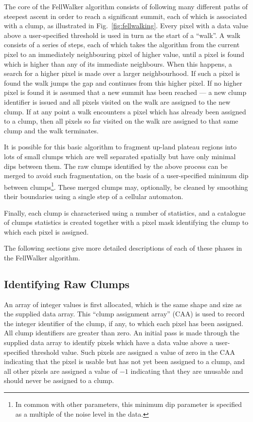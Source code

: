 \documentclass[final,authoryear,5p,times,twocolumn]{elsarticle}
\begin{document}
The core of the FellWalker algorithm consists of following many different
paths of steepest ascent in order to reach a significant summit, each of
which is associated with a clump, as illustrated in Fig.~\ref{fig:fellwalking}.
Every pixel with a data value above a user-specified threshold is used in
turn as the start of a ``walk''. A walk consists of a series of steps,
each of which takes the algorithm from the current pixel to an immediately
neighbouring pixel of higher value, until a pixel is found which is
higher than any of its immediate neighbours. When this happens, a search
for a higher pixel is made over a larger neighbourhood. If such a pixel
is found the walk jumps the gap and continues from this higher pixel. If no
higher pixel is found it is assumed that a new summit has been reached ---
a new clump identifier is issued and all pixels visited on the walk are
assigned to the new clump. If at any point a walk encounters a pixel
which has already been assigned to a clump, then all pixels so far
visited on the walk are assigned to that same clump and the walk
terminates.

It is possible for this basic algorithm to fragment up-land plateau
regions into lots of small clumps which are well separated spatially but
have only minimal dips between them. The raw clumps identified by the above
process can be merged to avoid such fragmentation, on the basis of a
user-specified minimum dip between clumps\footnote{In common with other
parameters, this minimum dip parameter is specified as a multiple of the
noise level in the data.}. These merged clumps may,
optionally, be cleaned by smoothing their boundaries using a single step
of a cellular automaton.

Finally, each clump is characterised using a number of statistics, and a
catalogue of clumps statistics is created together with a pixel mask
identifying the clump to which each pixel is assigned.

The following sections give more detailed descriptions of each of these
phases in the FellWalker algorithm.

\subsection{Identifying Raw Clumps}
\label{sec:raw}
An array of integer values is first allocated, which is the same shape
and size as the supplied data array. This ``clump assignment array''
(CAA) is used to record the integer identifier of the clump, if any, to
which each pixel has been assigned. All clump identifiers are greater
than zero. An initial pass is made through the supplied data array to
identify pixels which have a data value above a user-specified threshold
value. Such pixels are assigned a value of zero in the CAA indicating
that the pixel is usable but has not yet been assigned to a clump, and
all other pixels are assigned a value of $-1$ indicating that they are
unusable and should never be assigned to a clump.
\end{document}
